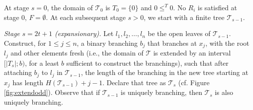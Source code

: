 \documentclass[a4paper,UKenglish,cleveref, autoref, thm-restate]{lipics-v2021}
\begin{document}
 At stage $s=0$, the domain of $\mathcal T_0$ is $T_0=\{0\}$ and $0 \leq^T 0$. No $R_i$ is satisfied at stage $0$, $F = \emptyset$. At each subsequent stage $s>0$, we start with a finite tree $\mathcal T_{s-1}$. 


\emph{Stage $s = 2t+1$ (expansionary).} Let $l_1, l_2, \dots, l_n$ be the open leaves of $\mathcal T_{s-1}$. Construct, for $1 \leq j \leq n$, a binary branching $b_j$ that branches at $x_j$, with the root $l_j$ and other elements fresh (i.e., the domain of $\mathcal T$ is extended by an interval $[|T_s|; b)$, for a least $b$ sufficient to construct the branchings), such that after attaching $b_j$ to $l_j$ in $\mathcal T_{s-1}$, the length of the branching in the new tree starting at $x_j$ has length $H(\mathcal T_{s-1}) + j - 1$. Declare that tree as $\mathcal T_s$ (cf. Figure \ref{fig:extendodd}). Observe that if $\mathcal T_{s-1}$ is uniquely branching, then $\mathcal T_s$ is also uniquely branching.
\end{document}
